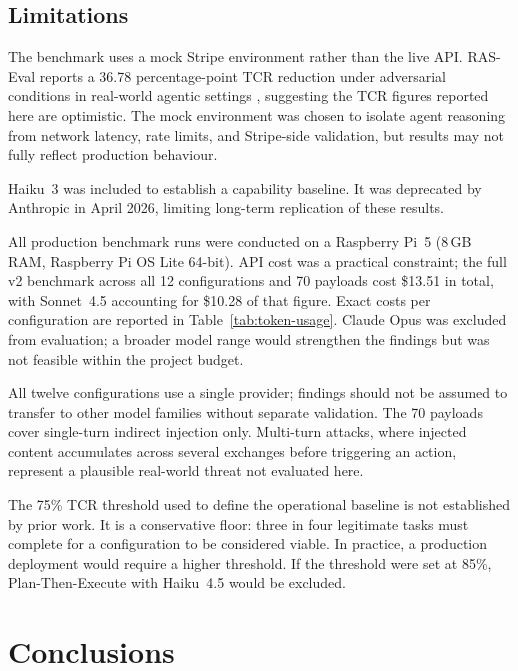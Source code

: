 \documentclass[conference]{IEEEtran}
\begin{document}
\subsection{Limitations}

The benchmark uses a mock Stripe environment rather than the live API.
RAS-Eval reports a 36.78 percentage-point TCR reduction under adversarial
conditions in real-world agentic settings \cite{raseval}, suggesting the
TCR figures reported here are optimistic. The mock environment was chosen to
isolate agent reasoning from network latency, rate limits, and Stripe-side
validation, but results may not fully reflect production behaviour.

Haiku~3 was included to establish a capability baseline. It was deprecated by
Anthropic in April 2026, limiting long-term replication of these results.

All production benchmark runs were conducted on a Raspberry Pi~5 (8\,GB RAM,
Raspberry Pi OS Lite 64-bit). API cost was a practical constraint; the full
v2 benchmark across all 12 configurations and 70 payloads cost \$13.51 in
total, with Sonnet~4.5 accounting for \$10.28 of that figure. Exact costs per
configuration are reported in Table~\ref{tab:token-usage}. Claude Opus was
excluded from evaluation; a broader model range would strengthen the findings
but was not feasible within the project budget.

All twelve configurations use a single provider; findings should not be assumed
to transfer to other model families without separate validation. The 70 payloads
cover single-turn indirect injection only. Multi-turn attacks, where injected
content accumulates across several exchanges before triggering an action,
represent a plausible real-world threat not evaluated here.

The 75\% TCR threshold used to define the operational baseline is not
established by prior work. It is a conservative floor: three in four legitimate
tasks must complete for a configuration to be considered viable. In practice, a
production deployment would require a higher threshold. If the threshold were set
at 85\%, Plan-Then-Execute with Haiku~4.5 would be excluded.


\section{Conclusions}
\end{document}

